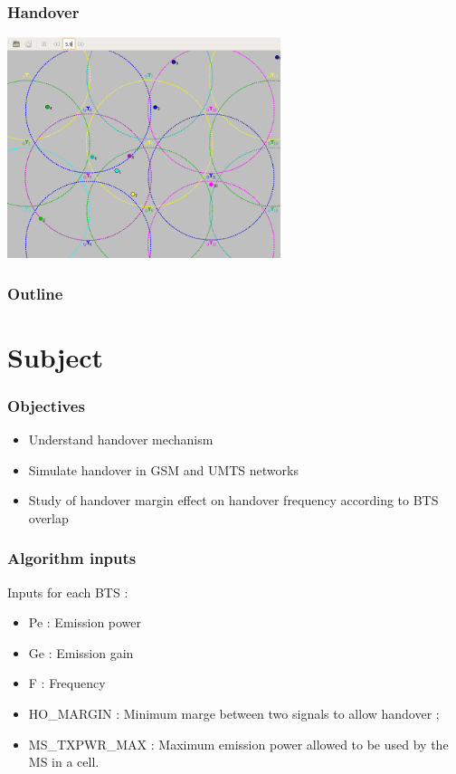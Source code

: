 \documentclass{beamer}
\author{Mathieu Briand\\
Marine Jourdain}
\begin{document}
\begin{frame}
\frametitle{Handover}

\begin{center}
  \includegraphics[width=0.6\textwidth]{./images/capture.png}
\end{center}

\end{frame}


\begin{frame}
\frametitle{Outline}

\tableofcontents

\end{frame}

\section{Subject}

\begin{frame}
\frametitle{Objectives}

\begin{itemize}
  \item Understand handover mechanism
  \item Simulate handover in GSM and UMTS networks
  \item Study of handover margin effect on handover frequency according to BTS
overlap
\end{itemize}
\end{frame}



\begin{frame}
\frametitle{Algorithm inputs}

Inputs for each BTS :
\begin{itemize}
  \item Pe : Emission power
  \item Ge : Emission gain
  \item F : Frequency
  \item HO\_MARGIN : Minimum marge between two signals to allow handover ;
  \item MS\_TXPWR\_MAX : Maximum emission power allowed to be used by the MS in a cell.
\end{itemize}

\end{frame}
\end{document}
